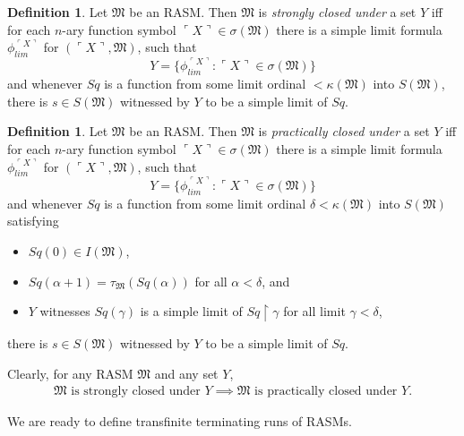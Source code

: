 \documentclass[12pt, twoside]{memoir}
\numberwithin{equation}{section}
\theoremstyle{definition}
\newtheorem{defi}[thm]{Definition}
\theoremstyle{remark}
\theoremstyle{definition}
\theoremstyle{definition}
\theoremstyle{definition}
\theoremstyle{remark}
\begin{document}
\begin{defi}\label{def237}
Let $\mathfrak{M}$ be an RASM. Then $\mathfrak{M}$ is \emph{strongly closed under} a set $Y$ iff for each $n$-ary function symbol $\ulcorner X \urcorner \in \sigma(\mathfrak{M})$ there is a simple limit formula $\phi_{lim}^{\ulcorner X \urcorner}$ for $(\ulcorner X \urcorner, \mathfrak{M})$, such that 
\begin{equation*}
    Y = \{\phi_{lim}^{\ulcorner X \urcorner} : \ulcorner X \urcorner \in \sigma(\mathfrak{M})\}
\end{equation*}
and whenever $Sq$ is a function from some limit ordinal $< \kappa(\mathfrak{M})$ into $S(\mathfrak{M})$, there is $s \in S(\mathfrak{M})$ witnessed by $Y$ to be a simple limit of $Sq$.
\end{defi}

\begin{defi}\label{def238}
Let $\mathfrak{M}$ be an RASM. Then $\mathfrak{M}$ is \emph{practically closed under} a set $Y$ iff for each $n$-ary function symbol $\ulcorner X \urcorner \in \sigma(\mathfrak{M})$ there is a simple limit formula $\phi_{lim}^{\ulcorner X \urcorner}$ for $(\ulcorner X \urcorner, \mathfrak{M})$, such that 
\begin{equation*}
    Y = \{\phi_{lim}^{\ulcorner X \urcorner} : \ulcorner X \urcorner \in \sigma(\mathfrak{M})\}
\end{equation*}
and whenever $Sq$ is a function from some limit ordinal $\delta < \kappa(\mathfrak{M})$ into $S(\mathfrak{M})$ satisfying
\begin{itemize}
    \item $Sq(0) \in I(\mathfrak{M})$,
    \item $Sq(\alpha + 1) = \tau_{\mathfrak{M}}(Sq(\alpha))$ for all $\alpha < \delta$, and
    \item $Y$ witnesses $Sq(\gamma)$ is a simple limit of $Sq \restriction \gamma$ for all limit $\gamma < \delta$,
\end{itemize}
there is $s \in S(\mathfrak{M})$ witnessed by $Y$ to be a simple limit of $Sq$.
\end{defi}

Clearly, for any RASM $\mathfrak{M}$ and any set $Y$,
\begin{align*}
    \mathfrak{M} \text{ is strongly closed under } Y \implies \mathfrak{M} \text{ is practically closed under } Y \text{.}
\end{align*}

We are ready to define transfinite terminating runs of RASMs.
\end{document}
